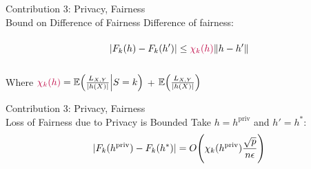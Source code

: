 \documentclass[17pt,aspectratio=169]{beamer}
\begin{document}
\begin{frame}[t]{\!Contribution 3: Privacy, Fairness\\[-0.5em]
    \normalsize Bound on Difference of Fairness}%
  Difference of fairness:
  \begin{align*}
    | F_{k}(h) - F_{k}(h') |
    \le
    \textcolor{purple}{\chi_{k}(h)}
    \|  h - h' \|
    \vphantom{\Bigg)}
  \end{align*}
  \pause
  \vspace{0.9em}

  Where
  $\textcolor{purple}{\chi_{k}(h)} = \mathbb E \Big( \tfrac{L_{X,Y}}{| h(X) |}
  \Big| S=k \Big)$ + $\mathbb E \Big( \tfrac{L_{X,Y}}{| h(X) |}
  \Big) $

  \vspace{1em}
\end{frame}

\begin{frame}[t]{\!Contribution 3: Privacy, Fairness\\[-0.5em]
    \normalsize Loss of Fairness due to Privacy is Bounded}%
  \vspace{-0.2em}
    Take $h = h^{\text{priv}}$ and $h' = h^*$:
     \begin{align*}
       | F_{k}(h^{\text{priv}}) - F_{k}(h^*) |
       = O\Bigg(
       \chi_{k}(h^{\text{priv}})
       \frac
       { \sqrt{p} }
       {n\epsilon}
       \Bigg)
     \end{align*}
  \vspace{1em}

  \vspace{1em}
\end{frame}
\end{document}
